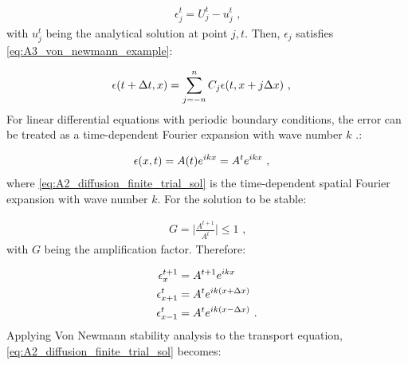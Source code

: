 \begin{equation}
    \begin{aligned}
        \epsilon_j^t=U_j^t-u_j^t\text{ ,} 
    \end{aligned} \label{eq:A2_error_function}
\end{equation}
\noindent with $u_j^t$ being the analytical solution at point $j,t$. Then, $\epsilon_j$ satisfies \autoref{eq:A3_von_newmann_example}:

\begin{equation}
    \begin{aligned}
        \epsilon \qty(t+\Delta t, x)&=\sum_{j=-n}^n C_j \epsilon\qty(t,x+j\Delta x)\text{ ,} 
    \end{aligned} \label{eq:A3_von_newmann_example}
\end{equation}
\noindent For linear differential equations with periodic boundary conditions, the error can be treated as a time-dependent Fourier expansion with wave number $k$ \citep{cdi_wiley_ebooks_10_1002_9783527683147_ch11_ch11}.:

\begin{equation}
    \begin{aligned}
    \epsilon\qty(x,t)&=A\qty(t)e^{ikx}=A^te^{ikx}\text{ ,} 
    \end{aligned} \label{eq:A2_diffusion_finite_trial_sol}
\end{equation}
\noindent where \autoref{eq:A2_diffusion_finite_trial_sol} is the time-dependent spatial Fourier expansion with wave number $k$. For the solution to be stable:

\begin{equation}
    \begin{aligned}
        G=\bigg| \frac{A^{t+1}}{A^t}\bigg| \leq 1\text{ ,} 
    \end{aligned}
\end{equation} 
\noindent with $G$ being the amplification factor. Therefore:

\begin{equation}
    \begin{aligned}
    \epsilon_x^{t+1}&= A^{t+1}e^{ikx} \\
    \epsilon_{x+1}^{t}&= A^{t}e^{ik\qty(x+\Delta x)} \\
    \epsilon_{x-1}^{t}&= A^{t}e^{ik\qty(x-\Delta x)}\text{ .} 
    \end{aligned} \label{eq:A2_diffusion_finite_trial_sol2}
\end{equation}
Applying Von Newmann stability analysis to the transport equation, \autoref{eq:A2_diffusion_finite_trial_sol} becomes:

